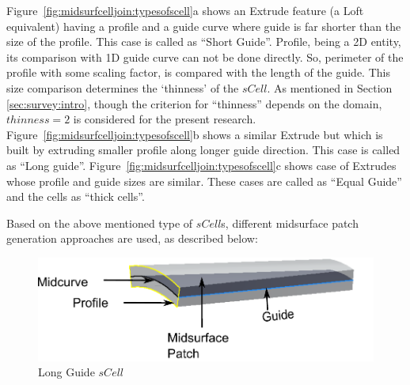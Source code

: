 Figure~\ref{fig:midsurfcelljoin:typesofscell}a shows an Extrude feature (a Loft equivalent) having a profile and a guide curve where guide is far shorter than the size of the profile. This case is called as ``Short Guide''. Profile, being a 2D entity, its comparison with 1D guide curve can not be done directly. So, perimeter of the profile with some scaling factor, is compared with the length of the guide. This size comparison determines the `thinness' of the $sCell$.  As mentioned in Section \ref{sec:survey:intro}, though the criterion for ``thinness'' depends on the domain, $thinness = 2$ is considered for the present research. Figure~\ref{fig:midsurfcelljoin:typesofscell}b shows a similar Extrude but which is built by extruding smaller profile along longer guide direction. This case is called as ``Long guide''. Figure~\ref{fig:midsurfcelljoin:typesofscell}c shows case of Extrudes whose profile and guide sizes are similar. These cases are called as ``Equal Guide'' and the cells as ``thick cells''.


Based on the above mentioned type of $sCell$s,  different midsurface patch generation approaches are used, as described below: 

\begin{figure}[h]
\centering \includegraphics[scale=0.62]{images//MidsurfSmallProfile_3.pdf} 
\caption{Long Guide $sCell$}
\label{figure_MidsurfSmallProfile_2}
\end{figure}



